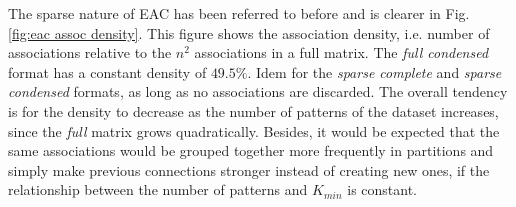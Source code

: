 The sparse nature of EAC has been referred to before and is clearer in Fig. \ref{fig:eac assoc density}.
This figure shows the association density, i.e. number of associations relative to the $n^2$ associations in a full matrix.
The \emph{full condensed} format has a constant density of $49.5\%$.
Idem for the \emph{sparse complete} and \emph{sparse condensed} formats, as long as no associations are discarded.
The overall tendency is for the density to decrease as the number of patterns of the dataset increases, since the \emph{full} matrix grows quadratically.
Besides, it would be expected that the same associations would be grouped together more frequently in partitions and simply make previous connections stronger instead of creating new ones, if the relationship between the number of patterns and $K_{min}$ is constant.

